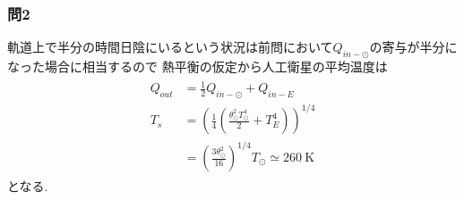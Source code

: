 \documentclass[uplatex,a4j,11pt,dvipdfmx]{jsarticle}
\begin{document}
\subsubsection*{問2}
軌道上で半分の時間日陰にいるという状況は前問において$Q_{in-\odot}$の寄与が半分になった場合に相当するので
熱平衡の仮定から人工衛星の平均温度は
\begin{align}
  \begin{split}
    Q_{out}&=\frac{1}{2}Q_{in-\odot}+Q_{in-E}\\
    T_s&=\left(\frac{1}{4}(\frac{\theta_\odot^2 T_\odot^4}{2}+T_E^4)\right)^{1/4}\\
    &=\left(\frac{3\theta_\odot^2}{16}\right)^{1/4}T_\odot\simeq 260\ \si{\kelvin}
  \end{split}
\end{align}
となる.
\end{document}
